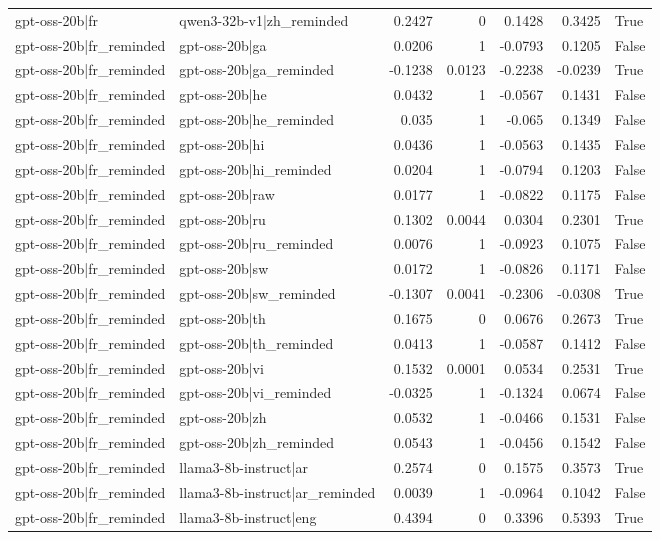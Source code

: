 \begin{table}
\begin{tabular}{l l r r r r l}
gpt-oss-20b|fr & qwen3-32b-v1|zh_reminded & 0.2427 & 0 & 0.1428 & 0.3425 & True \\
gpt-oss-20b|fr_reminded & gpt-oss-20b|ga & 0.0206 & 1 & -0.0793 & 0.1205 & False \\
gpt-oss-20b|fr_reminded & gpt-oss-20b|ga_reminded & -0.1238 & 0.0123 & -0.2238 & -0.0239 & True \\
gpt-oss-20b|fr_reminded & gpt-oss-20b|he & 0.0432 & 1 & -0.0567 & 0.1431 & False \\
gpt-oss-20b|fr_reminded & gpt-oss-20b|he_reminded & 0.035 & 1 & -0.065 & 0.1349 & False \\
gpt-oss-20b|fr_reminded & gpt-oss-20b|hi & 0.0436 & 1 & -0.0563 & 0.1435 & False \\
gpt-oss-20b|fr_reminded & gpt-oss-20b|hi_reminded & 0.0204 & 1 & -0.0794 & 0.1203 & False \\
gpt-oss-20b|fr_reminded & gpt-oss-20b|raw & 0.0177 & 1 & -0.0822 & 0.1175 & False \\
gpt-oss-20b|fr_reminded & gpt-oss-20b|ru & 0.1302 & 0.0044 & 0.0304 & 0.2301 & True \\
gpt-oss-20b|fr_reminded & gpt-oss-20b|ru_reminded & 0.0076 & 1 & -0.0923 & 0.1075 & False \\
gpt-oss-20b|fr_reminded & gpt-oss-20b|sw & 0.0172 & 1 & -0.0826 & 0.1171 & False \\
gpt-oss-20b|fr_reminded & gpt-oss-20b|sw_reminded & -0.1307 & 0.0041 & -0.2306 & -0.0308 & True \\
gpt-oss-20b|fr_reminded & gpt-oss-20b|th & 0.1675 & 0 & 0.0676 & 0.2673 & True \\
gpt-oss-20b|fr_reminded & gpt-oss-20b|th_reminded & 0.0413 & 1 & -0.0587 & 0.1412 & False \\
gpt-oss-20b|fr_reminded & gpt-oss-20b|vi & 0.1532 & 0.0001 & 0.0534 & 0.2531 & True \\
gpt-oss-20b|fr_reminded & gpt-oss-20b|vi_reminded & -0.0325 & 1 & -0.1324 & 0.0674 & False \\
gpt-oss-20b|fr_reminded & gpt-oss-20b|zh & 0.0532 & 1 & -0.0466 & 0.1531 & False \\
gpt-oss-20b|fr_reminded & gpt-oss-20b|zh_reminded & 0.0543 & 1 & -0.0456 & 0.1542 & False \\
gpt-oss-20b|fr_reminded & llama3-8b-instruct|ar & 0.2574 & 0 & 0.1575 & 0.3573 & True \\
gpt-oss-20b|fr_reminded & llama3-8b-instruct|ar_reminded & 0.0039 & 1 & -0.0964 & 0.1042 & False \\
gpt-oss-20b|fr_reminded & llama3-8b-instruct|eng & 0.4394 & 0 & 0.3396 & 0.5393 & True \\

\end{tabular}
\end{table}
